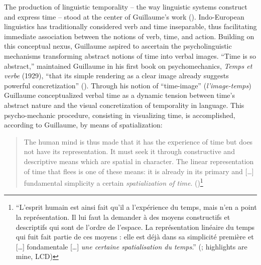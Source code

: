 \documentclass[output=paper]{langsci/langscibook}
\begin{document}
The production of linguistic temporality -- the way linguistic systems construct and express time -- stood at the center of Guillaume’s work (\citealt{joly_problemes_1980}). Indo-European linguistics has traditionally considered verb and time inseparable, thus facilitating immediate association between the notions of verb, time, and action. Building on this conceptual nexus, Guillaume aspired to ascertain the psycholinguistic mechanisms transforming abstract notions of time into verbal images. “Time is so abstract,” maintained Guillaume in his first book on psychomechanics, \textit{Temps et verbe} (1929), “that its simple rendering as a clear image already suggests powerful concretization” (\citealt[7]{guillaume_temps_1965}). Through his notion of “time-image” (\textit{l’image-temps}) Guillaume conceptualized verbal time as a dynamic tension between time’s abstract nature and the visual concretization of temporality in language. This psycho-mechanic procedure, consisting in visualizing time, is accomplished, according to Guillaume, by means of spatialization:

\begin{quote}
    The human mind is thus made that it has the experience of time but does not have its representation. It must seek it through constructive and descriptive means which are spatial in character. The linear representation of time that flees is one of these means: it is already in its primary and […] fundamental simplicity a certain \textit{spatialization of time}. (\citealt[17]{guillaume_larchitectonique_1965})\footnote{“L'esprit humain est ainsi fait qu'il a l'expérience du temps, mais n'en a point la représentation. Il lui faut la demander à des moyens constructifs et descriptifs qui sont de l'ordre de l'espace. La représentation linéaire du temps qui fuit fait partie de ces moyens : elle est déjà dans sa simplicité première et […] fondamentale […] \textit{une certaine spatialisation du temps}.” (\citealt[17]{guillaume_larchitectonique_1965}; highlights are mine, LCD)}
\end{quote}
\end{document}
